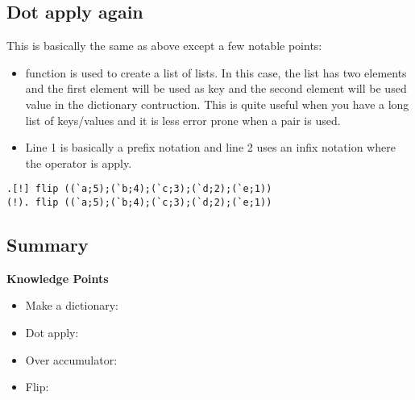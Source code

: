 \subsection{Dot apply again}
This is basically the same as above except a few notable points:
\begin{itemize}
\item function  is used to create a list of lists. In this case, the list has two elements and the first element will be used as key and the second element will be used value in the dictionary contruction. This is quite useful when you have a long list of keys/values and it is less error prone when a pair is used.
\item Line 1 is basically a prefix notation  and line 2 uses an infix notation  where the operator  is  apply.
\end{itemize}
\begin{verbatim}
.[!] flip ((`a;5);(`b;4);(`c;3);(`d;2);(`e;1))
(!). flip ((`a;5);(`b;4);(`c;3);(`d;2);(`e;1))
\end{verbatim}


\subsection{Summary}

\begin{noteblock}
\textbf{Knowledge Points}
\begin{itemize}
\item Make a dictionary: \href{https://code.kx.com/q/ref/dict/#dict}{}
\item Dot apply: \href{https://code.kx.com/q/ref/apply/}{}
\item Over accumulator: \href{https://code.kx.com/q/ref/accumulators/#binary-values}{\q{/}}
\item Flip: \href{https://code.kx.com/q/ref/flip/}{}
\end{itemize}
\end{noteblock}

\clearpage
